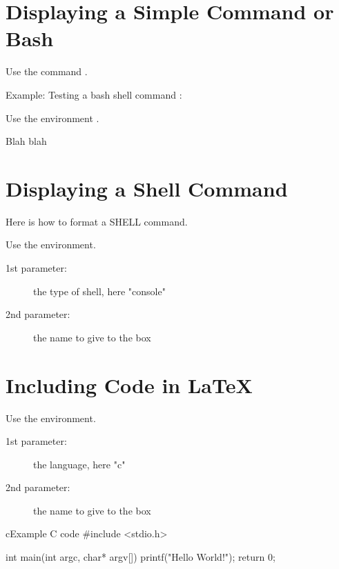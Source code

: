 \section{Displaying a Simple Command or Bash}

Use the command .

Example: Testing a bash shell command :

Use the environment .

Blah blah


\section{Displaying a Shell Command}
\label{sec:shell}

Here is how to format a SHELL command.

Use the  environment.
\begin{description}
	\item[1st parameter:] the type of shell, here "console"
	\item[2nd parameter:] the name to give to the box
\end{description}



\section{Including Code in LaTeX}

Use the  environment.
\begin{description}
	\item[1st parameter:] the language, here "c"
	\item[2nd parameter:] the name to give to the box
\end{description}

\begin{sourcebox}{c}{Example C code}
	#include <stdio.h>

	int main(int argc, char* argv[])
	{
			printf("Hello World!\n");
			return 0;
	}
\end{sourcebox}



